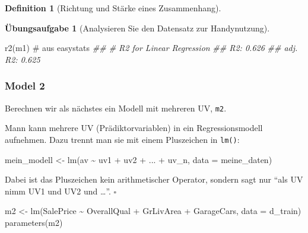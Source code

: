 \documentclass[
  a4paper,
  DIV=11]{scrreprt}
\newenvironment{Shaded}{\begin{snugshade}}{\end{snugshade}}
\newcommand{\AttributeTok}[1]{\textcolor[rgb]{0.40,0.45,0.13}{#1}}
\newcommand{\CommentTok}[1]{\textcolor[rgb]{0.37,0.37,0.37}{#1}}
\newcommand{\DocumentationTok}[1]{\textcolor[rgb]{0.37,0.37,0.37}{\textit{#1}}}
\newcommand{\FunctionTok}[1]{\textcolor[rgb]{0.28,0.35,0.67}{#1}}
\newcommand{\NormalTok}[1]{\textcolor[rgb]{0.00,0.23,0.31}{#1}}
\newcommand{\OtherTok}[1]{\textcolor[rgb]{0.00,0.23,0.31}{#1}}
\newcommand{\SpecialCharTok}[1]{\textcolor[rgb]{0.37,0.37,0.37}{#1}}
\theoremstyle{definition}
\newtheorem{exercise}{Übungsaufgabe}[chapter]
\theoremstyle{definition}
\theoremstyle{definition}
\newtheorem{definition}{Definition}[chapter]
\theoremstyle{remark}
\begin{document}
\begin{definition}[Richtung und Stärke eines
Zusammenhang]
\begin{exercise}[Analysieren Sie den Datensatz zur
Handynutzung]
\begin{Shaded}
\begin{Highlighting}[]
\FunctionTok{r2}\NormalTok{(m1)  }\CommentTok{\# aus easystats}
\DocumentationTok{\#\# \# R2 for Linear Regression}
\DocumentationTok{\#\#        R2: 0.626}
\DocumentationTok{\#\#   adj. R2: 0.625}
\end{Highlighting}
\end{Shaded}

\subsubsection{Model 2}\label{model-2}

Berechnen wir als nächstes ein Modell mit mehreren UV, \texttt{m2}.

\begin{tcolorbox}[enhanced jigsaw, leftrule=.75mm, opacitybacktitle=0.6, colback=white, colframe=quarto-callout-note-color-frame, coltitle=black, colbacktitle=quarto-callout-note-color!10!white, opacityback=0, left=2mm, breakable, titlerule=0mm, toptitle=1mm, bottomtitle=1mm, rightrule=.15mm, title=\textcolor{quarto-callout-note-color}{\faInfo}\hspace{0.5em}{Hinweis}, arc=.35mm, bottomrule=.15mm, toprule=.15mm]

Mann kann mehrere UV (Prädiktorvariablen) in ein Regressionsmodell
aufnehmen. Dazu trennt man sie mit einem Pluszeichen in \texttt{lm()}:

\begin{Shaded}
\begin{Highlighting}[]
\NormalTok{mein\_modell }\OtherTok{\textless{}{-}} \FunctionTok{lm}\NormalTok{(av }\SpecialCharTok{\textasciitilde{}}\NormalTok{ uv1 }\SpecialCharTok{+}\NormalTok{ uv2 }\SpecialCharTok{+}\NormalTok{ ... }\SpecialCharTok{+}\NormalTok{ uv\_n, }\AttributeTok{data =}\NormalTok{ meine\_daten)}
\end{Highlighting}
\end{Shaded}

Dabei ist das Pluszeichen kein arithmetischer Operator, sondern sagt nur
``als UV nimm UV1 und UV2 und \ldots{}''. \(\square\)

\end{tcolorbox}

\begin{Shaded}
\begin{Highlighting}[]
\NormalTok{m2 }\OtherTok{\textless{}{-}} \FunctionTok{lm}\NormalTok{(SalePrice }\SpecialCharTok{\textasciitilde{}}\NormalTok{ OverallQual }\SpecialCharTok{+}\NormalTok{ GrLivArea }\SpecialCharTok{+}\NormalTok{ GarageCars, }\AttributeTok{data =}\NormalTok{ d\_train)}
\FunctionTok{parameters}\NormalTok{(m2)}
\end{Highlighting}
\end{Shaded}


\end{exercise}
\end{definition}
\end{document}

